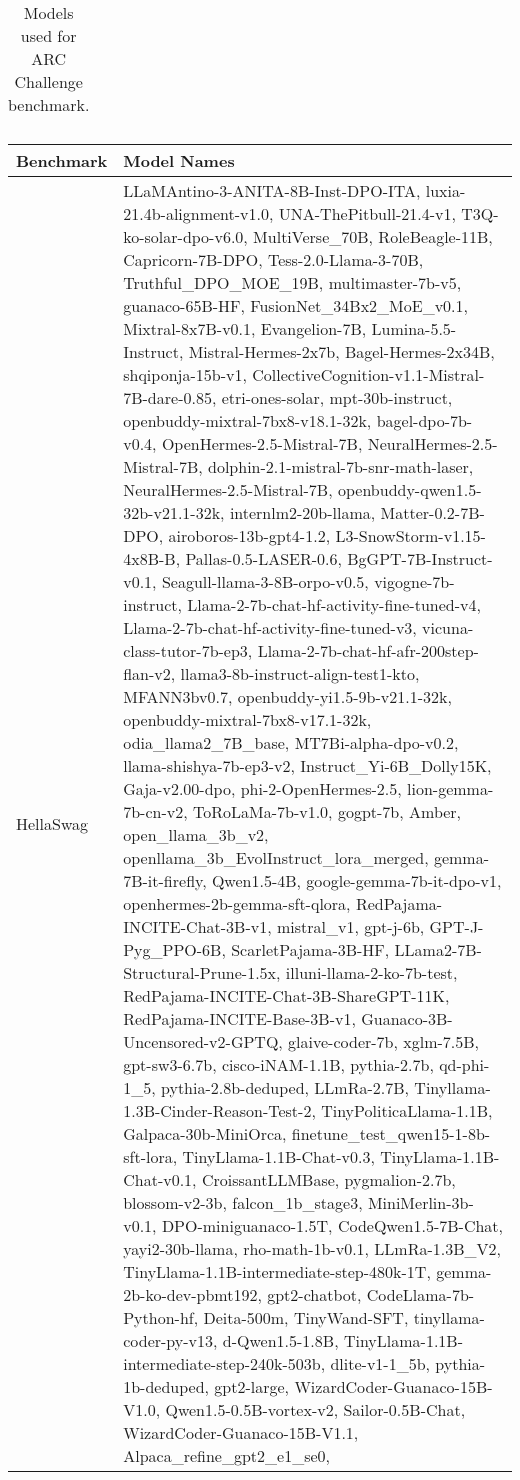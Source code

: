 \begin{table*}[htbp]
\begin{tabular}{p{2cm}p{12cm}}
        \bottomrule
    \end{tabular}
    \caption{Models used for ARC Challenge benchmark.}
    \label{apdtab:arc-model-list}
\end{table*}


\begin{table*}[htbp]
    \renewcommand{\arraystretch}{1.2}
    \centering
    \small
    \setlength{\tabcolsep}{0.5em} %
    \begin{tabular}{p{2cm}p{12cm}}
        \toprule
        \textbf{Benchmark} & \textbf{Model Names} \\
        \midrule
        HellaSwag & LLaMAntino-3-ANITA-8B-Inst-DPO-ITA, luxia-21.4b-alignment-v1.0, UNA-ThePitbull-21.4-v1, T3Q-ko-solar-dpo-v6.0, MultiVerse\_70B, RoleBeagle-11B, Capricorn-7B-DPO, Tess-2.0-Llama-3-70B, Truthful\_DPO\_MOE\_19B, multimaster-7b-v5, guanaco-65B-HF, FusionNet\_34Bx2\_MoE\_v0.1, Mixtral-8x7B-v0.1, Evangelion-7B, Lumina-5.5-Instruct, Mistral-Hermes-2x7b, Bagel-Hermes-2x34B, shqiponja-15b-v1, CollectiveCognition-v1.1-Mistral-7B-dare-0.85, etri-ones-solar, mpt-30b-instruct, openbuddy-mixtral-7bx8-v18.1-32k, bagel-dpo-7b-v0.4, OpenHermes-2.5-Mistral-7B, NeuralHermes-2.5-Mistral-7B, dolphin-2.1-mistral-7b-snr-math-laser, NeuralHermes-2.5-Mistral-7B, openbuddy-qwen1.5-32b-v21.1-32k, internlm2-20b-llama, Matter-0.2-7B-DPO, airoboros-13b-gpt4-1.2, L3-SnowStorm-v1.15-4x8B-B, Pallas-0.5-LASER-0.6, BgGPT-7B-Instruct-v0.1, Seagull-llama-3-8B-orpo-v0.5, vigogne-7b-instruct, Llama-2-7b-chat-hf-activity-fine-tuned-v4, Llama-2-7b-chat-hf-activity-fine-tuned-v3, vicuna-class-tutor-7b-ep3, Llama-2-7b-chat-hf-afr-200step-flan-v2, llama3-8b-instruct-align-test1-kto, MFANN3bv0.7, openbuddy-yi1.5-9b-v21.1-32k, openbuddy-mixtral-7bx8-v17.1-32k, odia\_llama2\_7B\_base, MT7Bi-alpha-dpo-v0.2, llama-shishya-7b-ep3-v2, Instruct\_Yi-6B\_Dolly15K, Gaja-v2.00-dpo, phi-2-OpenHermes-2.5, lion-gemma-7b-cn-v2, ToRoLaMa-7b-v1.0, gogpt-7b, Amber, open\_llama\_3b\_v2, openllama\_3b\_EvolInstruct\_lora\_merged, gemma-7B-it-firefly, Qwen1.5-4B, google-gemma-7b-it-dpo-v1, openhermes-2b-gemma-sft-qlora, RedPajama-INCITE-Chat-3B-v1, mistral\_v1, gpt-j-6b, GPT-J-Pyg\_PPO-6B, ScarletPajama-3B-HF, LLama2-7B-Structural-Prune-1.5x, illuni-llama-2-ko-7b-test, RedPajama-INCITE-Chat-3B-ShareGPT-11K, RedPajama-INCITE-Base-3B-v1, Guanaco-3B-Uncensored-v2-GPTQ, glaive-coder-7b, xglm-7.5B, gpt-sw3-6.7b, cisco-iNAM-1.1B, pythia-2.7b, qd-phi-1\_5, pythia-2.8b-deduped, LLmRa-2.7B, Tinyllama-1.3B-Cinder-Reason-Test-2, TinyPoliticaLlama-1.1B, Galpaca-30b-MiniOrca, finetune\_test\_qwen15-1-8b-sft-lora, TinyLlama-1.1B-Chat-v0.3, TinyLlama-1.1B-Chat-v0.1, CroissantLLMBase, pygmalion-2.7b, blossom-v2-3b, falcon\_1b\_stage3, MiniMerlin-3b-v0.1, DPO-miniguanaco-1.5T, CodeQwen1.5-7B-Chat, yayi2-30b-llama, rho-math-1b-v0.1, LLmRa-1.3B\_V2, TinyLlama-1.1B-intermediate-step-480k-1T, gemma-2b-ko-dev-pbmt192, gpt2-chatbot, CodeLlama-7b-Python-hf, Deita-500m, TinyWand-SFT, tinyllama-coder-py-v13, d-Qwen1.5-1.8B, TinyLlama-1.1B-intermediate-step-240k-503b, dlite-v1-1\_5b, pythia-1b-deduped, gpt2-large, WizardCoder-Guanaco-15B-V1.0, Qwen1.5-0.5B-vortex-v2, Sailor-0.5B-Chat, WizardCoder-Guanaco-15B-V1.1, Alpaca\_refine\_gpt2\_e1\_se0, 
\end{tabular}
\end{table*}
